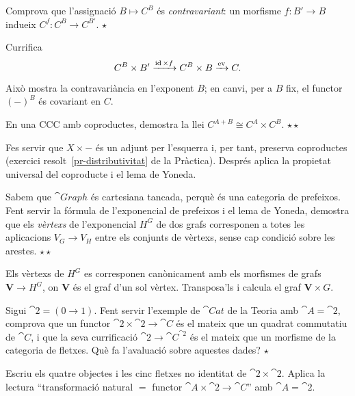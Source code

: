 \begin{exercici}
Comprova que l'assignació $B\mapsto C^{B}$ és \emph{contravariant}: un morfisme $f\colon B'\to B$ indueix $C^{f}\colon C^{B}\to C^{B'}$. \hfill{\normalfont$\star$}
\begin{indicacio}
Currifica
\[
C^{B}\times B'\xrightarrow{\operatorname{id}\times f}C^{B}\times B\xrightarrow{\operatorname{ev}}C.
\]
Això mostra la contravariància en l'exponent $B$; en canvi, per a $B$ fix, el functor $(-)^{B}$ és covariant en $C$.
\end{indicacio}
\end{exercici}

\begin{exercici}
En una CCC amb coproductes, demostra la llei $C^{A+B}\cong C^{A}\times C^{B}$. \hfill{\normalfont$\star\star$}
\begin{indicacio}
Fes servir que $X\times-$ és un adjunt per l'esquerra i, per tant, preserva coproductes (exercici resolt~\ref{pr-distributivitat} de la Pràctica). Després aplica la propietat universal del coproducte i el lema de Yoneda.
\end{indicacio}
\end{exercici}

\begin{exercici}
Sabem que $\cat{Graph}$ és cartesiana tancada, perquè és una categoria de prefeixos. Fent servir la fórmula de l'exponencial de prefeixos i el lema de Yoneda, demostra que els \emph{vèrtexs} de l'exponencial $H^{G}$ de dos grafs corresponen a totes les aplicacions $V_G\to V_H$ entre els conjunts de vèrtexs, sense cap condició sobre les arestes. \hfill{\normalfont$\star\star$}
\begin{indicacio}
Els vèrtexs de $H^{G}$ es corresponen canònicament amb els morfismes de grafs $\mathbf V\to H^{G}$, on $\mathbf V$ és el graf d'un sol vèrtex. Transposa'ls i calcula el graf $\mathbf V\times G$.
\end{indicacio}
\end{exercici}

\begin{exercici}
Sigui $\cat{2}=(0\to1)$. Fent servir l'exemple de $\cat{Cat}$ de la Teoria amb $\cat{A}=\cat{2}$, comprova que un functor $\cat{2}\times\cat{2}\to\cat{C}$ és el mateix que un quadrat commutatiu de $\cat{C}$, i que la seva currificació $\cat{2}\to\cat{C}^{\cat{2}}$ és el mateix que un morfisme de la categoria de fletxes. Què fa l'avaluació sobre aquestes dades? \hfill{\normalfont$\star$}
\begin{indicacio}
Escriu els quatre objectes i les cinc fletxes no identitat de $\cat{2}\times\cat{2}$. Aplica la lectura \enquote{transformació natural $=$ functor $\cat{A}\times\cat{2}\to\cat{C}$} amb $\cat{A}=\cat{2}$.
\end{indicacio}
\end{exercici}

